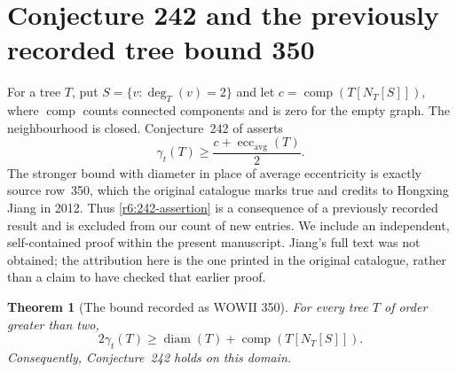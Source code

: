 \documentclass[11pt,a4paper]{article}
\newtheorem{theorem}{Theorem}[section]
\theoremstyle{remark}
\begin{document}
\section{Conjecture 242 and the previously recorded tree bound 350}
\label{r6:sec242}

For a tree $T$, put $S=\{v:\deg_T(v)=2\}$ and let
$c=\operatorname{comp}(T[N_T[S]])$, where $\operatorname{comp}$ counts
connected components and is zero for the empty graph.  The neighbourhood
is closed.  Conjecture~242 of \cite{WOWII} asserts
\begin{equation}
 \gamma_t(T)\ge\frac{c+\operatorname{ecc}_{\mathrm{avg}}(T)}{2}.
 \label{r6:242-assertion}
\end{equation}
The stronger bound with diameter in place of average eccentricity is
exactly source row~350, which the original catalogue marks true and
credits to Hongxing Jiang in 2012.  Thus \eqref{r6:242-assertion} is a
consequence of a previously recorded result and is excluded from our
count of new entries.  We include an independent, self-contained proof
within the present manuscript.  Jiang's full text was not obtained;
the attribution here is the one printed in the original catalogue,
rather than a claim to have checked that earlier proof.

\begin{theorem}[The bound recorded as WOWII 350]
\label{r6:242-strong}
For every tree $T$ of order greater than two,
\begin{equation}
  2\gamma_t(T)\ge \operatorname{diam}(T)
     +\operatorname{comp}(T[N_T[S]]).
  \label{r6:242-diameter}
\end{equation}
Consequently, Conjecture~242 holds on this domain.
\end{theorem}
\end{document}
